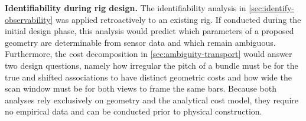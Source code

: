 \documentclass[a4paper, 12pt, twoside]{book}
\begin{document}
\textbf{Identifiability during rig design.} The identifiability analysis in \cref{sec:identify-observability} was applied retroactively to an existing rig. If conducted during the initial design phase, this analysis would predict which parameters of a proposed geometry are determinable from sensor data and which remain ambiguous. Furthermore, the cost decomposition in \cref{sec:ambiguity-transport} would answer two design questions, namely how irregular the pitch of a bundle must be for the true and shifted associations to have distinct geometric costs and how wide the scan window must be for both views to frame the same bars. Because both analyses rely exclusively on geometry and the analytical cost model, they require no empirical data and can be conducted prior to physical construction.



\cleardoublepage
\pagestyle{plain}
{
\backmatter
{}
{}



\AtNextBibliography{\small}
\sloppy
\printbibliography
}
\end{document}
